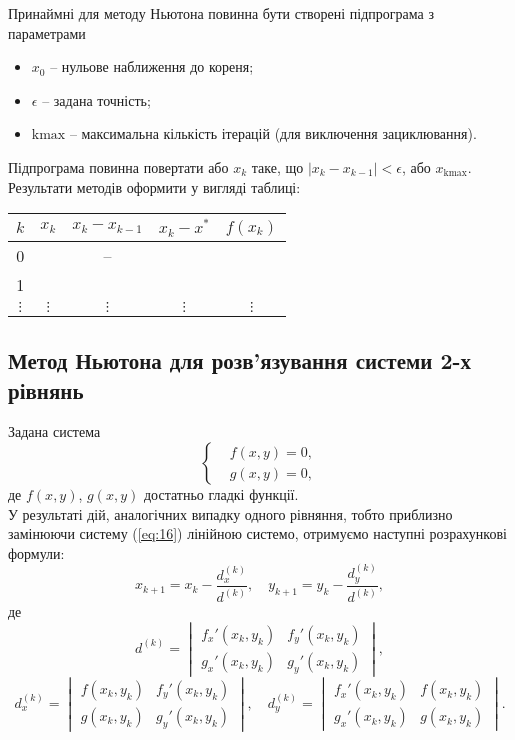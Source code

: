 Принаймні для методу Ньютона повинна бути створені підпрограма з параметрами
\begin{itemize}
	\item $x_0$ -- нульове наближення до кореня;
	\item $\epsilon$ -- задана точність;
	\item $\text{kmax}$ -- максимальна кількість ітерацій (для виключення зациклювання).
\end{itemize}

Підпрограма повинна повертати або $x_k$ таке, що $|x_k - x_{k - 1}| < \epsilon$, або $x_{\text{kmax}}$. Результати методів оформити у вигляді таблиці:
\begin{table}[H]
	\centering
	\begin{tabular}{|c|c|c|c|c|}
		\hline
		$k$ & $x_k$ & $x_k - x_{k-1}$ & $x_k - x^*$ & $f(x_k)$ \\ \hline
		0 & & -- & & \\ \hline
		1 & & & & \\ \hline
		$\vdots$ & $\vdots$ & $\vdots$ & $\vdots$ & $\vdots$ \\ \hline
	\end{tabular}
\end{table}

\subsection{Метод Ньютона для розв'язування системи 2-х рівнянь}

Задана система 
\begin{equation}
	\label{eq:16}
	\left\{
		\begin{aligned}
			& f(x, y) = 0, \\
			& g(x, y) = 0,
		\end{aligned}
	\right.
\end{equation}
де $f(x, y)$, $g(x, y)$ достатньо гладкі функції. \\

У результаті дій, аналогічних випадку одного рівняння, тобто приблизно замінюючи систему (\ref{eq:16}) лінійною системо, отримуємо наступні розрахункові формули:
\[ x_{k+1} = x_k - \frac{d_x^{(k)}}{d^{(k)}}, \quad y_{k+1} = y_k - \frac{d_y^{(k)}}{d^{(k)}}, \]
де
\[ d^{(k)} = \begin{vmatrix} f_x'(x_k, y_k) & f_y'(x_k, y_k) \\ g_x'(x_k, y_k) & g_y'(x_k, y_k) \end{vmatrix}, \]
\[ d_x^{(k)} = \begin{vmatrix} f(x_k, y_k) & f_y'(x_k, y_k) \\ g(x_k, y_k) & g_y'(x_k, y_k) \end{vmatrix}, \quad d_y^{(k)} = \begin{vmatrix} f_x'(x_k, y_k) & f(x_k, y_k) \\ g_x'(x_k, y_k) & g(x_k, y_k) \end{vmatrix}. \]

